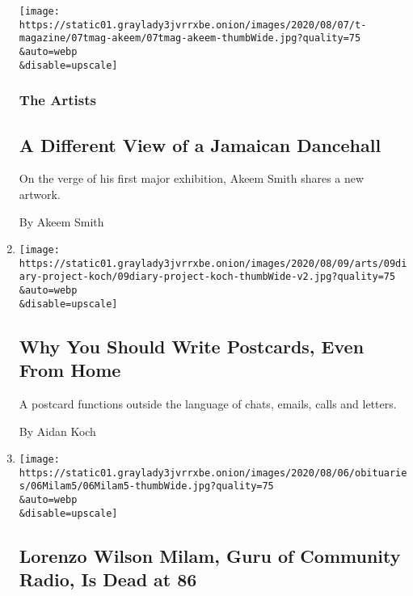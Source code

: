 \begin{enumerate}
  \texttt{[image: https://static01.graylady3jvrrxbe.onion/images/2020/08/07/t-magazine/07tmag-akeem/07tmag-akeem-thumbWide.jpg?quality=75\\\&auto=webp\\\&disable=upscale]}

  \hypertarget{the-artists}{%
  \subsubsection{The Artists}\label{the-artists}}

  \hypertarget{a-different-view-of-a-jamaican-dancehall}{%
  \subsection{A Different View of a Jamaican
  Dancehall}\label{a-different-view-of-a-jamaican-dancehall}}

  On the verge of his first major exhibition, Akeem Smith shares a new
  artwork.

  By Akeem Smith
\item
  \href{/2020/08/07/arts/aidan-koch-postcards.html}{}

  \texttt{[image: https://static01.graylady3jvrrxbe.onion/images/2020/08/09/arts/09diary-project-koch/09diary-project-koch-thumbWide-v2.jpg?quality=75\\\&auto=webp\\\&disable=upscale]}

  \hypertarget{why-you-should-write-postcards-even-from-home}{%
  \subsection{Why You Should Write Postcards, Even From
  Home}\label{why-you-should-write-postcards-even-from-home}}

  A postcard functions outside the language of chats, emails, calls and
  letters.

  By Aidan Koch
\item
  \href{/2020/08/07/business/media/lorenzo-milam-dead.html}{}

  \texttt{[image: https://static01.graylady3jvrrxbe.onion/images/2020/08/06/obituaries/06Milam5/06Milam5-thumbWide.jpg?quality=75\\\&auto=webp\\\&disable=upscale]}

  \hypertarget{lorenzo-wilson-milam-guru-of-community-radio-is-dead-at-86}{%
  \subsection{Lorenzo Wilson Milam, Guru of Community Radio, Is Dead at
  86}\label{lorenzo-wilson-milam-guru-of-community-radio-is-dead-at-86}}


\end{enumerate}
